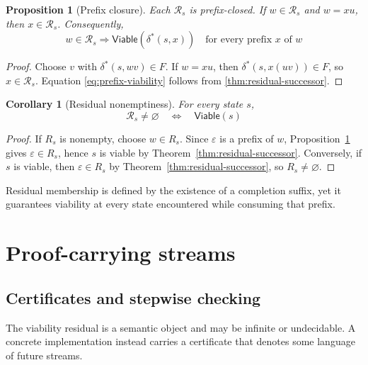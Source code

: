 \documentclass[11pt]{article}
\newtheorem{proposition}[proposition]{Proposition}
\newtheorem{corollary}[corollary]{Corollary}
\theoremstyle{definition}
\newcommand{\Accept}{F}
\newcommand{\Run}{\delta^{*}}
\newcommand{\Viable}{\mathsf{Viable}}
\newcommand{\Residual}{\mathcal R}
\begin{document}
\begin{proposition}[Prefix closure]\label{prop:prefix-closure}
Each $\Residual_s$ is prefix-closed. If $w\in\Residual_s$ and $w=xu$, then $x\in\Residual_s$. Consequently,
\begin{equation}\label{eq:prefix-viability}
  w\in\Residual_s
  \Longrightarrow
  \Viable(\Run(s,x))
  \quad\text{for every prefix }x\text{ of }w
\end{equation}
\end{proposition}

\begin{proof}
Choose $v$ with $\Run(s,wv)\in\Accept$. If $w=xu$, then $\Run(s,x(uv))\in\Accept$, so $x\in\Residual_s$. Equation \eqref{eq:prefix-viability} follows from \cref{thm:residual-successor}.
\end{proof}

\begin{corollary}[Residual nonemptiness]\label{cor:residual-nonempty}
For every state $s$,
\begin{equation}\label{eq:residual-nonempty}
  \Residual_s\ne\varnothing
  \quad\Longleftrightarrow\quad
  \Viable(s)
\end{equation}
\end{corollary}

\begin{proof}
If $R_s$ is nonempty, choose $w\in R_s$. Since $\varepsilon$ is a prefix
of $w$, Proposition~\ref{prop:prefix-closure} gives $\varepsilon\in R_s$,
hence $s$ is viable by Theorem~\ref{thm:residual-successor}. Conversely,
if $s$ is viable, then $\varepsilon\in R_s$ by
Theorem~\ref{thm:residual-successor}, so $R_s\neq\varnothing$.
\end{proof}

Residual membership is defined by the existence of a completion suffix, yet it guarantees viability at every state encountered while consuming that prefix.

\section{Proof-carrying streams}\label{sec:pcs}

\subsection{Certificates and stepwise checking}

The viability residual is a semantic object and may be infinite or undecidable. A concrete implementation instead carries a certificate that denotes some language of future streams.
\end{document}
